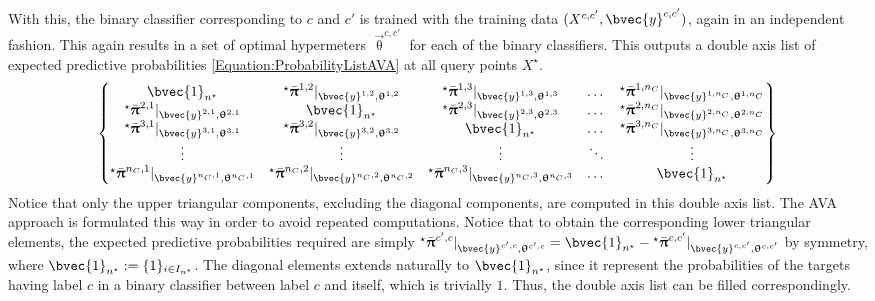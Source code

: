 				With this, the binary classifier corresponding to $c$ and $c'$ is trained with the training data $(X^{c, c'}, \bvec{y}^{c, c'})$, again in an independent fashion. This again results in a set of optimal hypermeters $\vec{\uptheta}^{c, c'}$ for each of the binary classifiers. This outputs a double axis list of expected predictive probabilities \eqref{Equation:ProbabilityListAVA} at all query points $X^{\star}$. \begin{equation}
					\begin{Bmatrix*}
						\bvec{1}_{n^{\star}} & {^{\star}}\bar{\vec{\uppi}}^{1, 2} |_{\bvec{y}^{1, 2}, \vec{\uptheta}^{1, 2}} & {^{\star}}\bar{\vec{\uppi}}^{1, 3} |_{\bvec{y}^{1, 3}, \vec{\uptheta}^{1, 3}} & \dots & {^{\star}}\bar{\vec{\uppi}}^{1, n_{C}} |_{\bvec{y}^{1, n_{C}}, \vec{\uptheta}^{1, n_{C}}} \\
						{^{\star}}\bar{\vec{\uppi}}^{2, 1} |_{\bvec{y}^{2, 1}, \vec{\uptheta}^{2, 1}} & \bvec{1}_{n^{\star}} & {^{\star}}\bar{\vec{\uppi}}^{2, 3} |_{\bvec{y}^{2, 3}, \vec{\uptheta}^{2, 3}} & \dots & {^{\star}}\bar{\vec{\uppi}}^{2, n_{C}} |_{\bvec{y}^{2, n_{C}}, \vec{\uptheta}^{2, n_{C}}} \\
						{^{\star}}\bar{\vec{\uppi}}^{3, 1} |_{\bvec{y}^{3, 1}, \vec{\uptheta}^{3, 1}} & {^{\star}}\bar{\vec{\uppi}}^{3, 2} |_{\bvec{y}^{3, 2}, \vec{\uptheta}^{3, 2}} & \bvec{1}_{n^{\star}} & \dots & {^{\star}}\bar{\vec{\uppi}}^{3, n_{C}} |_{\bvec{y}^{3, n_{C}}, \vec{\uptheta}^{3, n_{C}}} \\
						\vdots & \vdots & \vdots & \ddots & \vdots \\
						{^{\star}}\bar{\vec{\uppi}}^{n_{C}, 1} |_{\bvec{y}^{n_{C}, 1}, \vec{\uptheta}^{n_{C}, 1}} & {^{\star}}\bar{\vec{\uppi}}^{n_{C}, 2} |_{\bvec{y}^{n_{C}, 2}, \vec{\uptheta}^{n_{C}, 2}} & {^{\star}}\bar{\vec{\uppi}}^{n_{C}, 3} |_{\bvec{y}^{n_{C}, 3}, \vec{\uptheta}^{n_{C}, 3}} & \dots & \bvec{1}_{n^{\star}}
					\end{Bmatrix*} 
				\label{Equation:ProbabilityListAVA}
				\end{equation} Notice that only the upper triangular components, excluding the diagonal components, are computed in this double axis list. The AVA approach is formulated this way in order to avoid repeated computations. Notice that to obtain the corresponding lower triangular elements, the expected predictive probabilities required are simply ${^{\star}}\bar{\vec{\uppi}}^{c', c} |_{\bvec{y}^{c', c}, \vec{\uptheta}^{c', c}} = \bvec{1}_{n^{\star}} - {^{\star}}\bar{\vec{\uppi}}^{c, c'} |_{\bvec{y}^{c, c'}, \vec{\uptheta}^{c, c'}}$ by symmetry, where $\bvec{1}_{n^{\star}} := \{1\}_{i \in I_{n^{\star}}}$. The diagonal elements extends naturally to $\bvec{1}_{n^{\star}}$, since it represent the probabilities of the targets having label $c$ in a binary classifier between label $c$ and itself, which is trivially $1$. Thus, the double axis list can be filled correspondingly.

